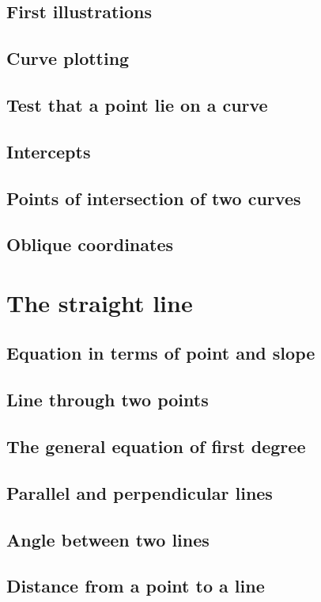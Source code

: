 \documentclass{book}
\begin{document}
	\section{First illustrations} \lipsum[1]
	\section{Curve plotting} \lipsum[2]
	\section{Test that a point lie on a curve} \lipsum[3]
	\section{Intercepts} \lipsum[4]
	\section{Points of intersection of two curves} \lipsum[5]
	\section{Oblique coordinates} \lipsum[6]

\chapter{The straight line}
	\section{Equation in terms of point and slope} \lipsum[1]
	\section{Line through two points} \lipsum[2]
	\section{The general equation of first degree} \lipsum[3]
	\section{Parallel and perpendicular lines} \lipsum[4]
	\section{Angle between two lines} \lipsum[5]
	\section{Distance from a point to a line} \lipsum[6]
\end{document}
